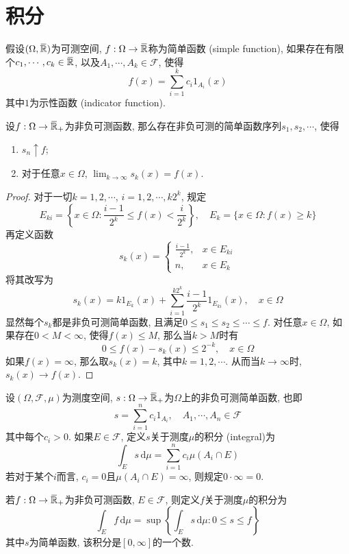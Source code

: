 \documentclass[cn, 12pt, math=mtpro2, bibstyle=apa, blue, twocol]{elegantbook}
\newcommand{\F}{\mathcal{F}}
\newcommand{\R}{\mathbb{R}}
\newcommand{\du}{\,\text{d}\mu}
\newcommand{\overbar}[1]{\mkern 1.5mu\overline{\mkern-1.5mu#1\mkern-1.5mu}\mkern 1.5mu}
\begin{document}
\section{积分}

\begin{definition}
假设$(\Omega,\overbar{\R})$为可测空间, $f:\Omega\to\overbar{\R}$称为简单函数 (simple function), 如果存在有限个$c_1,\cdots,c_k\in\overbar{\R}$, 以及$A_1,\cdots,A_k\in\F$, 使得
$$f(x)=\sum_{i=1}^{k}c_i1_{A_i}(x)$$
其中$1$为示性函数 (indicator function).
\end{definition}

\begin{theorem}
  设$f:\Omega\to\overbar{\R}_+$为非负可测函数, 那么存在非负可测的简单函数序列$s_1,s_2,\cdots$, 使得
  \begin{enumerate}[label=(\arabic*)]
  \item $s_n\uparrow f$;
  \item 对于任意$x\in\Omega$, $\lim_{k\to\infty}s_k(x)=f(x)$.
  \end{enumerate}
\end{theorem}
\begin{proof}
  对于一切$k=1,2,\cdots$, $i=1,2,\cdots,k2^k$, 规定
  $$E_{ki}=\left\{x\in \Omega:\frac{i-1}{2^k}\leq f(x)<\frac{i}{2^k} \right\},\quad E_k=\{x\in \Omega: f(x)\geq k\}$$
  再定义函数
  $$s_k(x)=\begin{cases}
             \displaystyle\frac{i-1}{2^k}, & x\in E_{ki} \\
             n, & x\in E_{k}
           \end{cases}$$
  将其改写为
  $$s_k(x)=k1_{E_k}(x)+\sum_{i=1}^{k2^k}\frac{i-1}{2^k}1_{E_{ki}}(x),\quad x\in \Omega$$
  显然每个$s_k$都是非负可测简单函数, 且满足$0\leq s_1\leq s_2\leq\cdots\leq f$. 对任意$x\in\Omega$, 如果存在$0<M<\infty$, 使得$f(x)\leq M$, 那么当$k>M$时有
  $$0\leq f(x)-s_k(x)\leq 2^{-k},\quad x\in\Omega$$
  如果$f(x)=\infty$, 那么取$s_k(x)=k$, 其中$k=1,2,\cdots$. 从而当$k\to\infty$时, $s_k(x)\to f(x)$.
\end{proof}
\begin{definition}
设$(\Omega,\F,\mu)$为测度空间, $s:\Omega\to \overbar{\R}_+$为$\Omega$上的非负可测简单函数, 也即
$$s=\sum_{i=1}^{n}c_i1_{A_i},\quad A_1,\cdots,A_n\in\F$$
其中每个$c_i>0$. 如果$E\in\F$, 定义$s$关于测度$\mu$的积分 (integral)为
$$\int_Es\,\text{d}\mu=\sum_{i=1}^{n}c_i\mu(A_i\cap E)$$
若对于某个$i$而言, $c_i=0$且$\mu(A_i\cap E)=\infty$, 则规定$0\cdot\infty=0$.
\end{definition}
\begin{definition}
若$f:\Omega\to\overbar{\R}_+$为非负可测函数, $E\in\F$, 则定义$f$关于测度$\mu$的积分为
$$\int_Ef\du=\sup\left\{\int_Es\du: 0\leq s\leq f\right\}$$
其中$s$为简单函数, 该积分是$[0,\infty]$的一个数.
\end{definition}
\end{document}
